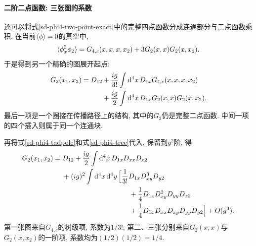 \paragraph{二阶二点函数: 三张图的系数}
还可以将式\eqref{sd-phi4-two-point-exact}中的完整四点函数分成连通部分与二点函数乘积. 在当前$\braket{\phi}=0$的真空中,
\begin{equation}
    \braket{\phi_x^3\phi_2}=G_{4,c}(x,x,x,x_2)+3G_2(x,x)G_2(x,x_2).
\end{equation}
于是得到另一个精确的图展开起点:
\begin{align}
    G_2(x_1,x_2)=D_{12}
    &+\frac{ig}{3!}\int\mathrm d^4x\,D_{1x}G_{4,c}(x,x,x,x_2)\notag\\
    &+\frac{ig}{2}\int\mathrm d^4x\,D_{1x}G_2(x,x)G_2(x,x_2).
    \label{sd-phi4-two-point-connected}
\end{align}
最后一项是一个圈接在传播路径上的结构, 其中的$G_2$仍是完整二点函数. 中间一项的四个插入则属于同一个连通块.

再将式\eqref{sd-phi4-tadpole}和式\eqref{sd-phi4-tree}代入, 保留到$g^2$阶, 得
\begin{align}
    G_2(x_1,x_2)={}&D_{12}+\frac{ig}{2}\int\d^4x\,D_{1x}D_{xx}D_{x2}\notag\\
    &+(ig)^2\int\d^4x\,\d^4y\,
    \Big[\frac1{3!}D_{1x}D_{xy}^3D_{y2}\notag\\
    &\hspace{34mm}+\frac14D_{1x}D_{xy}^2D_{yy}D_{x2}\notag\\
    &\hspace{34mm}+\frac14D_{1x}D_{xx}D_{xy}D_{yy}D_{y2}\Big]+O(g^3).
    \label{sd-phi4-two-point-second-order}
\end{align}
第一张图来自$G_{4,c}$的树级项, 系数为$1/3!$; 第二、三张分别来自$G_2(x,x)$与$G_2(x,x_2)$的一阶项, 系数均为$(1/2)(1/2)=1/4$.

